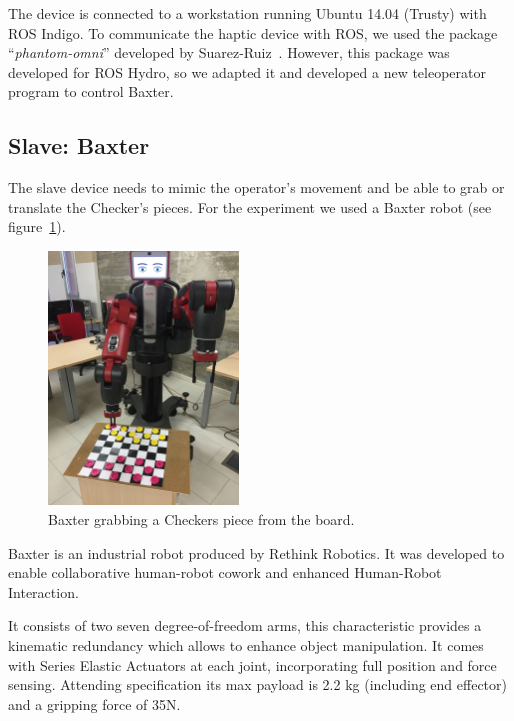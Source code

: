 \documentclass[journal,twoside]{JoPhA}
\begin{document}
  The device is connected to a workstation running Ubuntu 14.04 (Trusty) with ROS Indigo. To communicate the haptic device with ROS, we used the package ``\emph{phantom-{}omni}'' developed by Suarez-Ruiz~\cite{SuarezRuiz12}. However, this package was developed for ROS Hydro, so we adapted it and developed a new teleoperator program to control Baxter.

  \subsection{Slave: Baxter}
  \label{subsec:environment:slave}

  The slave device needs to mimic the operator's movement and be able to grab or translate the Checker's pieces. For the experiment we used a Baxter robot (see figure~\ref{fig:environment:slave}).

\begin{figure}[!ht]
  \centering
  \includegraphics[width=0.45\textwidth]{Images/BaxterDamas1.jpg}
  
  \caption{Baxter grabbing a Checkers piece from the board.}
  \label{fig:environment:slave}
\end{figure}

Baxter is an industrial robot produced by Rethink Robotics.
It was developed to enable collaborative human-robot  cowork  and enhanced   Human-Robot Interaction. 

It consists  of two seven degree-of-freedom arms, this characteristic provides a kinematic redundancy which allows to enhance object manipulation.
It comes with Series Elastic Actuators at each joint, 
incorporating  full  position  and  force  sensing. 
Attending specification its max payload is 2.2 kg (including end effector) and a gripping force of 35N.
\end{document}
